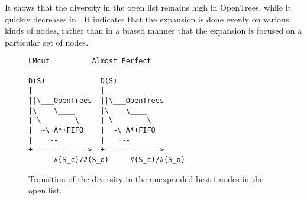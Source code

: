 It shows that the diversity in the open list remains high in OpenTrees, while it quickly decreases in \astar. It indicates that the expansion is done evenly on various kinds of nodes, rather than in a biased manner that the expansion is focused on a particular set of nodes.

\begin{figure}[htbp]
\begin{verbatim}
LMcut          Almost Perfect       

D(S)             D(S)                             
|                |             
||\___OpenTrees  ||\___OpenTrees
|\    \____      |\    \____   
| \        \__   | \        \__
|  ~\ A*+FIFO    |  ~\ A*+FIFO 
|    ~-_______   |    ~-_______
+------------->  +------------->
      #(S_c)/#(S_o)     #(S_c)/#(S_o)
\end{verbatim}
\caption{Transition of the diversity in the unexpanded best-f nodes in the open list.}
\label{diversity-transition}
\end{figure}
